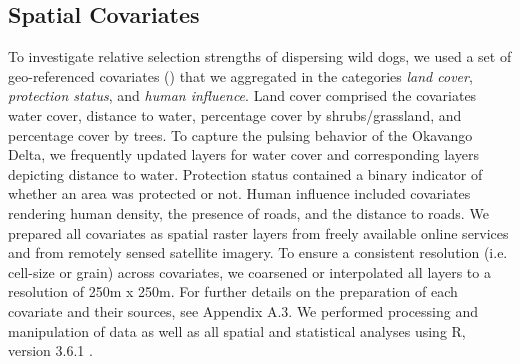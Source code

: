 \documentclass[abstract=on,10pt,a4paper,bibliography=totocnumbered]{article}
\begin{document}
\subsection{Spatial Covariates}
To investigate relative selection strengths  of
dispersing wild dogs, we used a set of geo-referenced covariates
() that we aggregated in the categories \textit{land cover},
\textit{protection status}, and \textit{human influence}. Land cover comprised
the covariates water cover, distance to water, percentage cover by
shrubs/grassland, and percentage cover by trees. To capture the pulsing behavior
of the Okavango Delta, we frequently updated layers for water cover and
corresponding layers depicting distance to water. Protection status contained a
binary indicator of whether an area was protected or not. Human influence
included covariates rendering human density, the presence of roads, and the
distance to roads. We prepared all covariates as spatial raster layers from freely
available online services and from remotely sensed satellite imagery. To ensure
a consistent resolution (i.e. cell-size or grain) across covariates, we
coarsened or interpolated all layers to a resolution of 250m x 250m. For further
details on the preparation of each covariate and their sources, see Appendix
A.3. We performed processing and manipulation of data as well as all spatial and
statistical analyses using R, version 3.6.1 \citep{R.2019}.
\end{document}
